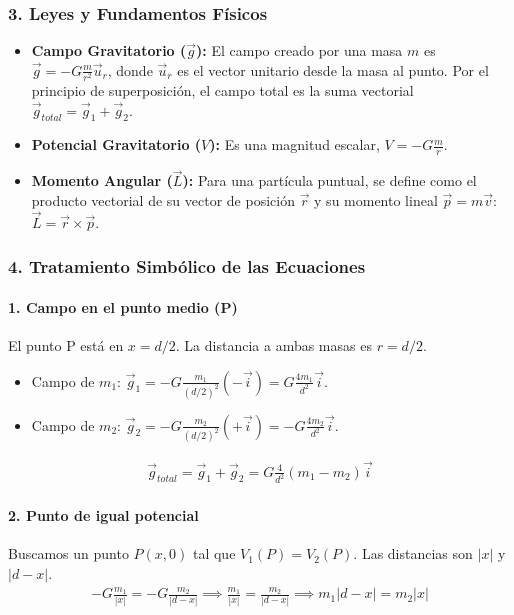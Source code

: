 \subsubsection*{3. Leyes y Fundamentos Físicos}
\begin{itemize}
    \item \textbf{Campo Gravitatorio ($\vec{g}$):} El campo creado por una masa $m$ es $\vec{g} = -G\frac{m}{r^2}\vec{u}_r$, donde $\vec{u}_r$ es el vector unitario desde la masa al punto. Por el principio de superposición, el campo total es la suma vectorial $\vec{g}_{total} = \vec{g}_1 + \vec{g}_2$.
    \item \textbf{Potencial Gravitatorio ($V$):} Es una magnitud escalar, $V = -G\frac{m}{r}$.
    \item \textbf{Momento Angular ($\vec{L}$):} Para una partícula puntual, se define como el producto vectorial de su vector de posición $\vec{r}$ y su momento lineal $\vec{p}=m\vec{v}$: $\vec{L} = \vec{r} \times \vec{p}$.
\end{itemize}

\subsubsection*{4. Tratamiento Simbólico de las Ecuaciones}
\paragraph{1. Campo en el punto medio (P)}
El punto P está en $x=d/2$. La distancia a ambas masas es $r=d/2$.
\begin{itemize}
    \item Campo de $m_1$: $\vec{g}_1 = -G\frac{m_1}{(d/2)^2}(-\vec{i}) = G\frac{4m_1}{d^2}\vec{i}$.
    \item Campo de $m_2$: $\vec{g}_2 = -G\frac{m_2}{(d/2)^2}(+\vec{i}) = -G\frac{4m_2}{d^2}\vec{i}$.
\end{itemize}
\begin{gather}
    \vec{g}_{total} = \vec{g}_1 + \vec{g}_2 = G\frac{4}{d^2}(m_1 - m_2)\vec{i}
\end{gather}
\paragraph{2. Punto de igual potencial}
Buscamos un punto $P(x,0)$ tal que $V_1(P) = V_2(P)$. Las distancias son $|x|$ y $|d-x|$.
\begin{gather}
    -G\frac{m_1}{|x|} = -G\frac{m_2}{|d-x|} \implies \frac{m_1}{|x|} = \frac{m_2}{|d-x|} \implies m_1|d-x| = m_2|x|
\end{gather}
